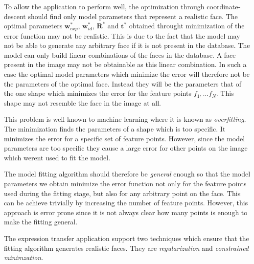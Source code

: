 \documentclass[11pt,a4paper]{report}
\begin{document}
To allow the application to perform well, the optimization through coordinate-descent
should find only model parameters that represent a realistic face. The optimal
parameters $\mathbf{w}^*_{exp}$, $\mathbf{w}^*_{id}$, $\mathbf{R}^*$ and
$\mathbf{t}^*$ obtained throught minimization of the error function may not be realistic. This is due to the fact that the model may not
be able to generate any arbitrary face if it is not present in the database. The model
can only build linear combinations of the faces in the database. A face present
in the image may not be obtainable as this linear combination. In such a case the
optimal model parameters which minimize the error will therefore not be the parameters
of the optimal face. Instead they will be the parameters that of the one shape which
minimizes the error for the feature points $f_1, \ldots f_N$. This shape may not
resemble the face in the image at all. 

This problem is well known to machine learning
where it is known as \textit{overfitting}. The minimization finds the parameters
of a shape which is too specific. It minimizes the error for a specific set of
feature points. However, since the model parameters are too specific they cause
a large error for other points on the image which werent used to fit the
model. 

The model fitting algorithm should therefore be \textit{general} enough so that
the model parameters we obtain minimize the error function not only for the feature points used during the fitting stage, but also for any
arbitrary point on the face. This can be achieve trivially by increasing the
number of feature points. However, this approach is error prone since it is not
always clear how many points is enough to make the fitting general. 

The expression transfer application support two techniques which ensure that the
fitting algorithm generates realistic faces. They are \textit{regularization}
and \textit{constrained minimzation}.
\end{document}
